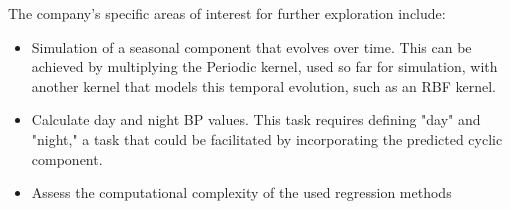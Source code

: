 The company's specific areas of interest for further exploration include:

\begin{itemize}
    \item Simulation of a seasonal component that evolves over time.
    This can be achieved by multiplying the Periodic kernel, used so far for simulation,
    with another kernel that models this temporal evolution, such as an RBF kernel.

    \item Calculate day and night BP values. This task requires defining "day" and "night," a task that could be
    facilitated by incorporating the predicted cyclic component.

    \item Assess the computational complexity of the used regression methods

\end{itemize}





